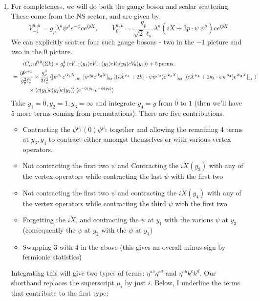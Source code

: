 \documentclass[11pt, class=article, crop=false]{standalone}
\begin{document}
\begin{enumerate}
	\item For completeness, we will do both the gauge boson and scalar scattering. These come from the NS sector, and are given by:
	\[
		V_{-1}^{a, \mu} = g_p \lambda^a \psi^\mu e^{-\phi} c e^{i p X}, \qquad
		V_{0}^{a, \mu} = \frac{g_p}{\sqrt 2 \ell_s} \lambda^a (i \dot X + 2 p \cdot \psi \, \psi^\mu) c e^{i p X}
	\]
	We can explicitly scatter four such gauge bosons - two in the $-1$ picture and two in the $0$ picture.
	\[
	\begin{aligned}
		& \qquad i C_{D^2} \cancel\delta^{10}(\Sigma k) \times g_p^4 \braket{c V_{-1}(y_1) c V_{-1}(y_2) c V_{0}(y_3) c V_{0}(y_4)} + 5 \,\mathrm{perms.} \\
		& = \frac{i \cancel\delta^{p+1}}{g_p^2 \ell_s^4} \times \frac{g_p^4}{2\ell_s^2} \braket{[\psi^{\mu_1} e^{ik_1 X}]_{y_1}\;
		 [\psi^{\mu_2} e^{ik_2 X}]_{y_2} \;
		[(i {\dot X}^{\mu_3} + 2 k_3 \cdot \psi \psi^{\mu_3}) e^{i k_3 X}]_{y_3}\;
		[(i {\dot X}^{\mu_4} + 2 k_4 \cdot \psi \psi^{\mu_4}) e^{i k_4 X}]_{y_4}\;
		  }  \\ & \qquad  \quad \times \braket{c(y_1) c(y_2) c(y_3)} \braket{e^{-\phi(y_1)} e^{- \phi(y_2)}}
	\end{aligned}
	\]
	Take $y_1 = 0, y_2 = 1, y_3 = \infty$ and integrate $y_4 = y$ from $0$ to $1$ (then we'll have 5 more terms coming from permutations). There are five contributions. 
	\begin{itemize}
		\item Contracting the $\psi^{\mu_1}(0) \psi^{\mu_2}$ together and allowing the remaining 4 terms at $y_3, y_4$ to contract either amongst themselves or with various vertex operators. 
		\item Not contracting the first two $\psi$ and Contracting the $i \dot X(y_3)$ with any of the vertex operators while contracting the last $\psi$ with the first two
		\item Not contracting the first two $\psi$ and contracting the $i \dot X(y_4)$ with any of the vertex operators while contracting the third $\psi$ with the first two
		\item Forgetting the $i \dot X$, and contracting the $\psi$ at $y_1$ with the various $\psi$ at $y_3$ (consequently the $\psi$ at $y_2$ with the $\psi$ at $y_4$)
		\item Swapping $3$ with $4$ in the above (this gives an overall minus sign by fermionic statistics)
	\end{itemize}
	Integrating this will give two types of terms: $\eta^{ab} \eta^{cd}$ and $\eta^{ab} k^c k^d$. Our shorthand replaces the superscript $\mu_i$ by just  $i$. Below, I underline the terms that contribute to the first type:

\end{enumerate}
\end{document}
